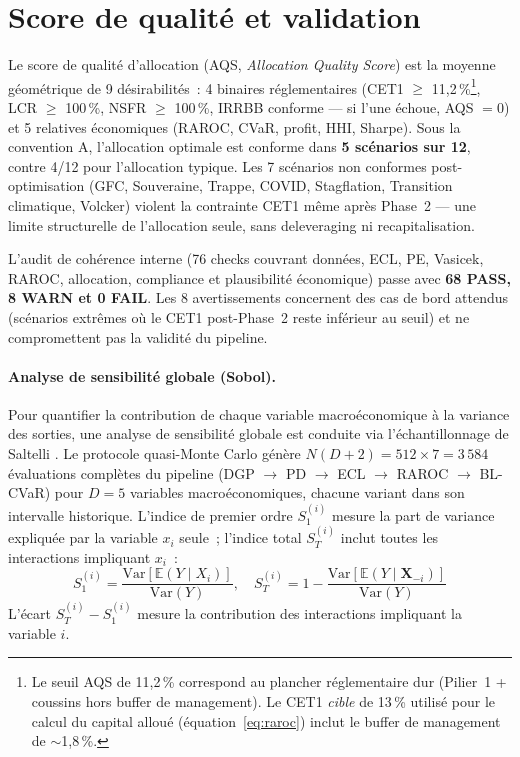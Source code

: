 \documentclass[10pt, a4paper, oneside]{report}
\theoremstyle{definition}
\begin{document}
\section{Score de qualité et validation}
\label{sec:ch4:aqs}

Le score de qualité d'allocation (AQS, \emph{Allocation Quality Score}) est la moyenne géométrique de 9 désirabilités~: 4 binaires réglementaires (CET1 $\geq$ 11{,}2\,\%\footnote{Le seuil AQS de 11{,}2\,\% correspond au plancher réglementaire dur (Pilier~1 + coussins hors buffer de management). Le CET1 \emph{cible} de 13\,\% utilisé pour le calcul du capital alloué (équation~\ref{eq:raroc}) inclut le buffer de management de $\sim$1{,}8\,\%.}, LCR $\geq$ 100\,\%, NSFR $\geq$ 100\,\%, IRRBB conforme --- si l'une échoue, AQS $= 0$) et 5 relatives économiques (RAROC, CVaR, profit, HHI, Sharpe). Sous la convention A, l'allocation optimale est conforme dans \textbf{5 scénarios sur 12}, contre 4/12 pour l'allocation typique. Les 7 scénarios non conformes post-optimisation (GFC, Souveraine, Trappe, COVID, Stagflation, Transition climatique, Volcker) violent la contrainte CET1 même après Phase~2 --- une limite structurelle de l'allocation seule, sans deleveraging ni recapitalisation.

L'audit de cohérence interne (76 checks couvrant données, ECL, PE, Vasicek, RAROC, allocation, compliance et plausibilité économique) passe avec \textbf{68 PASS, 8 WARN et 0 FAIL}. Les 8 avertissements concernent des cas de bord attendus (scénarios extrêmes où le CET1 post-Phase~2 reste inférieur au seuil) et ne compromettent pas la validité du pipeline.

\paragraph{Analyse de sensibilité globale (Sobol).} Pour quantifier la contribution de chaque variable macroéconomique à la variance des sorties, une analyse de sensibilité globale est conduite via l'échantillonnage de Saltelli \citep{saltelli2002}. Le protocole quasi-Monte Carlo génère $N(D + 2) = 512 \times 7 = 3\,584$ évaluations complètes du pipeline (DGP $\to$ PD $\to$ ECL $\to$ RAROC $\to$ BL-CVaR) pour $D = 5$ variables macroéconomiques, chacune variant dans son intervalle historique. L'indice de premier ordre $S_1^{(i)}$ mesure la part de variance expliquée par la variable $x_i$ seule~; l'indice total $S_T^{(i)}$ inclut toutes les interactions impliquant $x_i$~:
%
\begin{equation}
S_1^{(i)} = \frac{\text{Var}[\mathbb{E}(Y \mid X_i)]}{\text{Var}(Y)}, \quad S_T^{(i)} = 1 - \frac{\text{Var}[\mathbb{E}(Y \mid \mathbf{X}_{-i})]}{\text{Var}(Y)}
\label{eq:sobol}
\end{equation}
%
\noindent L'écart $S_T^{(i)} - S_1^{(i)}$ mesure la contribution des interactions impliquant la variable $i$.
\end{document}
